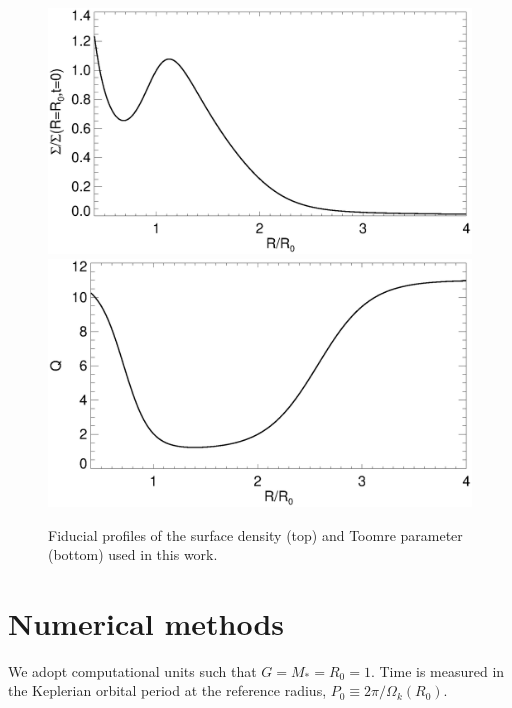 \begin{figure}
  \includegraphics[width=\linewidth,clip=true,trim=0cm 1.7cm 0cm
  0cm]{figures/compare_profiles_dens000} 
  \includegraphics[width=\linewidth]{figures/compare_profiles_Q000}
  \caption{Fiducial profiles of the surface density (top) and Toomre
    parameter (bottom) used in this work.\label{initial_surf}}
\end{figure}


\section{Numerical methods}

We adopt computational units such that $G=M_*=R_0=1$. Time is measured
in the Keplerian orbital period at the reference radius, $P_0\equiv 
2\pi/\Omega_k(R_0)$.  

